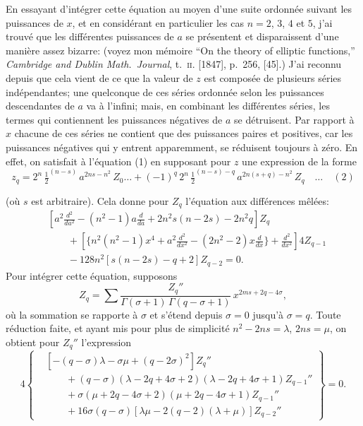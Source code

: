 \documentclass[11pt]{article}
\begin{document}
\medskip
En essayant d'int\'egrer cette \'equation au moyen d'une suite ordonn\'ee suivant les
puissances de $x$, et en consid\'erant en particulier les cas $n = 2$, $3$, $4$ et $5$, j'ai trouv\'e
que les diff\'erentes puissances de $a$ se pr\'esentent et disparaissent d'une mani\`ere assez
bizarre: (voyez mon m\'emoire ``On the theory of elliptic functions,'' \textit{Cambridge and Dublin
Math.\ Journal}, t.~\textsc{ii}. [1847], p.~256, [45].) J'ai reconnu depuis que cela vient de ce que
la valeur de $z$ est compos\'ee de plusieurs s\'eries ind\'ependantes; une quelconque de ces
s\'eries ordonn\'ee selon les puissances descendantes de $a$ va \`a l'infini; mais, en combinant
les diff\'erentes s\'eries, les termes qui contiennent les puissances n\'egatives de $a$ se
d\'etruisent. Par rapport \`a $x$ chacune de ces s\'eries ne contient que des puissances
paires et positives, car les puissances n\'egatives qui y entrent apparemment, se r\'eduisent
toujours \`a z\'ero. En effet, on satisfait \`a l'\'equation (1) en supposant pour $z$ une
expression de la forme
\[
z_{q} = 2^{n}\,\tfrac{1}{2}^{(n - s)}\,a^{2n s - n^{2}}\,Z_{0}\ldots + (-1)^{q}\,2^{n}\,\tfrac{1}{2}^{(n - s) - q}\,a^{2n(s + q) - n^{2}}\,Z_{q}\quad\ldots\quad (2)
\]


(o\`u $s$ est arbitraire). Cela donne pour $Z_{q}$ l'\'equation aux diff\'erences m\^el\'ees:
\begin{align*}
&\left[a^{2}\frac{d^{2}}{da^{2}} - (n^{2} - 1)a\frac{d}{da} + 2n^{2}s(n - 2s) - 2n^{2}q\right]Z_{q}\\
&\qquad + \left[\{n^{2}(n^{2} - 1)x^{4} + a^{2}\frac{d^{2}}{dx^{2}} - (2n^{2} - 2)x\frac{d}{dx}\} + \frac{d^{2}}{dx^{2}}\right]4Z_{q - 1}\\
&\qquad - 128n^{2}[s(n - 2s) - q + 2]Z_{q - 2} = 0.
\end{align*}
Pour int\'egrer cette \'equation, supposons
\[
Z_{q} = \sum\frac{Z_{q}''}{\Gamma(\sigma + 1)\,\Gamma(q - \sigma + 1)}\,x^{2ms + 2q - 4\sigma},
\]
o\`u la sommation se rapporte \`a $\sigma$ et s'\'etend depuis $\sigma = 0$ jusqu'\`a $\sigma = q$. Toute r\'eduction
faite, et ayant mis pour plus de simplicit\'e $n^{2} - 2ns = \lambda$, $2ns = \mu$, on obtient pour
$Z_{q}''$ l'expression
\[
4\!\left\{\begin{aligned}
&[-(q - \sigma)\lambda - \sigma\mu + (q - 2\sigma)^{2}]Z_{q}''\\
&\qquad + (q - \sigma)(\lambda - 2q + 4\sigma + 2)(\lambda - 2q + 4\sigma + 1)Z_{q - 1}''\\
&\qquad + \sigma(\mu + 2q - 4\sigma + 2)(\mu + 2q - 4\sigma + 1)Z_{q - 1}''\\
&\qquad + 16\sigma(q - \sigma)[\lambda\mu - 2(q - 2)(\lambda + \mu)]Z_{q - 2}''
\end{aligned}\right\} = 0.
\]
\end{document}
